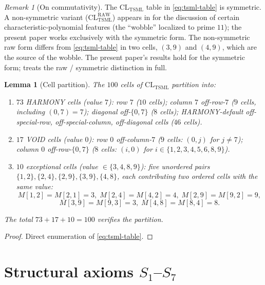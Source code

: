 \documentclass[11pt,reqno]{amsart}
\theoremstyle{plain}
\newtheorem{lemma}[theorem]{Lemma}
\theoremstyle{definition}
\theoremstyle{remark}
\newtheorem*{remark}{Remark}
\newcommand{\TSML}{\mathrm{TSML}}
\newcommand{\CL}{\mathrm{CL}}
\begin{document}
\begin{remark}[On commutativity]
The $\CL_{\TSML}$ table in \eqref{eq:tsml-table} is symmetric. A
non-symmetric variant ($\CL_{\TSML}^{\text{RAW}}$) appears in
\cite{SandersGishFourCore} for the discussion of certain
characteristic-polynomial features (the ``wobble'' localized to prime
$11$); the present paper works exclusively with the symmetric form.
The non-symmetric raw form differs from \eqref{eq:tsml-table} in two
cells, $(3, 9)$ and $(4, 9)$, which are the source of the wobble. The
present paper's results hold for the symmetric form;
\cite{SandersGishFourCore} treats the raw / symmetric distinction in
full.
\end{remark}

\begin{lemma}[Cell partition]
\label{lem:partition}
The $100$ cells of $\CL_{\TSML}$ partition into:
\begin{enumerate}
\item $73$ \emph{HARMONY} cells (value $7$): row $7$ ($10$ cells);
column $7$ off-row-$7$ ($9$ cells, including $(0, 7) = 7$); diagonal
off-$\{0, 7\}$ ($8$ cells); HARMONY-default off-special-row,
off-special-column, off-diagonal cells ($46$ cells).
\item $17$ \emph{VOID} cells (value $0$): row $0$ off-column-$7$
($9$ cells: $(0, j)$ for $j \neq 7$); column $0$ off-row-$\{0, 7\}$
($8$ cells: $(i, 0)$ for $i \in \{1, 2, 3, 4, 5, 6, 8, 9\}$).
\item $10$ \emph{exceptional} cells (value $\in \{3, 4, 8, 9\}$):
five unordered pairs $\{1, 2\}, \{2, 4\}, \{2, 9\}, \{3, 9\}, \{4, 8\}$,
each contributing two ordered cells with the same value:
\[
M[1, 2] = M[2, 1] = 3, \;
M[2, 4] = M[4, 2] = 4, \;
M[2, 9] = M[9, 2] = 9,
\]
\[
M[3, 9] = M[9, 3] = 3, \;
M[4, 8] = M[8, 4] = 8.
\]
\end{enumerate}
The total $73 + 17 + 10 = 100$ verifies the partition.
\end{lemma}

\begin{proof}
Direct enumeration of \eqref{eq:tsml-table}.
\end{proof}

\section{Structural axioms $S_{1}$--$S_{7}$}
\label{sec:axioms}
\end{document}
